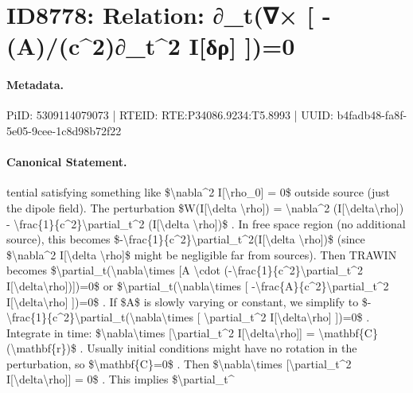 \section*{ID8778: Relation: ∂\_t(∇× [ -(A)/(c\textasciicircum{}2)∂\_t\textasciicircum{}2 I[δρ] ])=0}
\paragraph{Metadata.}
PiID: 5309114079073 | RTEID: RTE:P34086.9234:T5.8993 | UUID: b4fadb48-fa8f-5e05-9cee-1c8d98b72f22

\paragraph{Canonical Statement.}
tential satisfying something like \$\textbackslash{}nabla\textasciicircum{}2 I[\textbackslash{}rho\_0] = 0\$ outside source (just the dipole field). The perturbation \$W(I[\textbackslash{}delta \textbackslash{}rho]) = \textbackslash{}nabla\textasciicircum{}2 (I[\textbackslash{}delta\textbackslash{}rho]) - \textbackslash{}frac\{1\}\{c\textasciicircum{}2\}\textbackslash{}partial\_t\textasciicircum{}2 (I[\textbackslash{}delta \textbackslash{}rho])\$ . In free space region (no additional source), this becomes \$-\textbackslash{}frac\{1\}\{c\textasciicircum{}2\}\textbackslash{}partial\_t\textasciicircum{}2(I[\textbackslash{}delta \textbackslash{}rho])\$ (since \$\textbackslash{}nabla\textasciicircum{}2 I[\textbackslash{}delta \textbackslash{}rho]\$ might be negligible far from sources). Then TRAWIN becomes \$\textbackslash{}partial\_t(\textbackslash{}nabla\textbackslash{}times [A \textbackslash{}cdot (-\textbackslash{}frac\{1\}\{c\textasciicircum{}2\}\textbackslash{}partial\_t\textasciicircum{}2 I[\textbackslash{}delta\textbackslash{}rho])])=0\$ or \$\textbackslash{}partial\_t(\textbackslash{}nabla\textbackslash{}times [ -\textbackslash{}frac\{A\}\{c\textasciicircum{}2\}\textbackslash{}partial\_t\textasciicircum{}2 I[\textbackslash{}delta\textbackslash{}rho] ])=0\$ . If \$A\$ is slowly varying or constant, we simplify to \$-\textbackslash{}frac\{1\}\{c\textasciicircum{}2\}\textbackslash{}partial\_t(\textbackslash{}nabla\textbackslash{}times [ \textbackslash{}partial\_t\textasciicircum{}2 I[\textbackslash{}delta\textbackslash{}rho] ])=0\$ . Integrate in time: \$\textbackslash{}nabla\textbackslash{}times [\textbackslash{}partial\_t\textasciicircum{}2 I[\textbackslash{}delta\textbackslash{}rho]] = \textbackslash{}mathbf\{C\}(\textbackslash{}mathbf\{r\})\$ . Usually initial conditions might have no rotation in the perturbation, so \$\textbackslash{}mathbf\{C\}=0\$ . Then \$\textbackslash{}nabla\textbackslash{}times [\textbackslash{}partial\_t\textasciicircum{}2 I[\textbackslash{}delta\textbackslash{}rho]] = 0\$ . This implies \$\textbackslash{}partial\_t\textasciicircum{}

